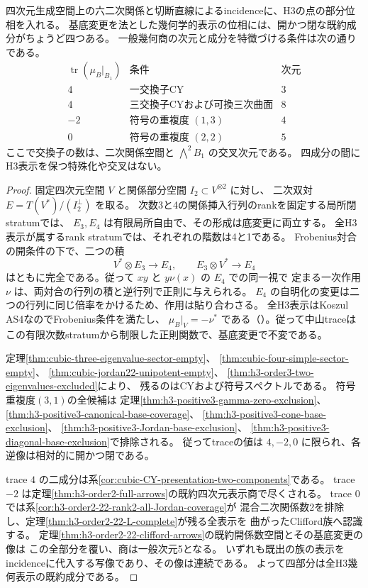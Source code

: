 \begin{theorem}\label{thm:h3-presentation-four-components}
四次元生成空間上の六二次関係と切断直線によるincidenceに、H3の点の部分位相を入れる。
基底変更を法とした幾何学的表示の位相には、開かつ閉な既約成分がちょうど四つある。
一般幾何商の次元と成分を特徴づける条件は次の通りである。
\[
\begin{array}{c|l|c}
\operatorname{tr}(\mu_B|_{B_1})&\text{条件}&\text{次元}\\\hline
4&\text{一交換子CY}&3\\
4&\text{三交換子CYおよび可換三次曲面}&8\\
-2&\text{符号の重複度 }(1,3)&4\\
0&\text{符号の重複度 }(2,2)&5
\end{array}
\]
ここで交換子の数は、二次関係空間と $\bigwedge^2 B_1$ の交叉次元である。
四成分の間にH3表示を保つ特殊化や交叉はない。
\end{theorem}
\begin{proof}
固定四次元空間 $V$ と関係部分空間 $I_2\subset V^{\otimes 2}$ に対し、
二次双対 $E=T(V^*)/(I_2^\perp)$ を取る。
次数3と4の関係挿入行列のrankを固定する局所閉stratumでは、
$E_3,E_4$ は有限局所自由で、その形成は底変更に両立する。
全H3表示が属するrank stratumでは、それぞれの階数は4と1である。
Frobenius対合の開条件の下で、二つの積
\[
 V^*\otimes E_3\longrightarrow E_4,\qquad
 E_3\otimes V^*\longrightarrow E_4
\]
はともに完全である。従って $xy$ と $y\nu(x)$ の $E_4$ での同一視で
定まる一次作用 $\nu$ は、両対合の行列の積と逆行列で正則に与えられる。
$E_4$ の自明化の変更は二つの行列に同じ倍率をかけるため、作用は貼り合わさる。
全H3表示はKoszul AS4なのでFrobenius条件を満たし、
$\mu_B|_V=-\nu^*$ である（\cite[Theorem 6.3の証明]{RRZ}）。従って中山traceは
この有限次数stratumから制限した正則関数で、基底変更で不変である。

定理\ref{thm:cubic-three-eigenvalue-sector-empty}、
\ref{thm:cubic-four-simple-sector-empty}、
\ref{thm:cubic-jordan22-unipotent-empty}、
\ref{thm:h3-order3-two-eigenvalues-excluded}により、
残るのはCYおよび符号スペクトルである。
符号重複度$(3,1)$の全候補は
定理\ref{thm:h3-positive3-gamma-zero-exclusion}、
\ref{thm:h3-positive3-canonical-base-coverage}、
\ref{thm:h3-positive3-cone-base-exclusion}、
\ref{thm:h3-positive3-Jordan-base-exclusion}、
\ref{thm:h3-positive3-diagonal-base-exclusion}で排除される。
従ってtraceの値は $4,-2,0$ に限られ、各逆像は相対的に開かつ閉である。

trace $4$ の二成分は系\ref{cor:cubic-CY-presentation-two-components}である。
trace $-2$ は定理\ref{thm:h3-order2-full-arrows}の既約四次元表示商で尽くされる。
trace $0$ では系\ref{cor:h3-order2-22-rank2-all-Jordan-coverage}が
混合二次関係数2を排除し、定理\ref{thm:h3-order2-22-L-complete}が残る全表示を
曲がったClifford族へ認識する。
定理\ref{thm:h3-order2-22-clifford-arrows}の既約開係数空間とその基底変更の像は
この全部分を覆い、商は一般次元5となる。
いずれも既出の族の表示をincidenceに代入する写像であり、その像は連続である。
よって四部分は全H3幾何表示の既約成分である。
\end{proof}

